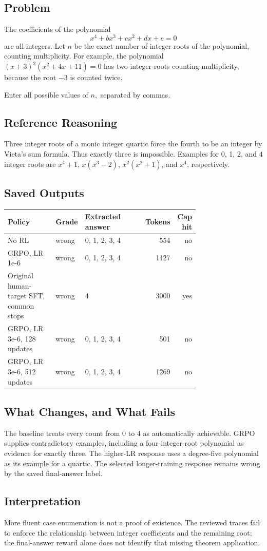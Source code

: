 \documentclass[10pt,letterpaper]{article}
\begin{document}
\subsection*{Problem}
The coefficients of the polynomial
\[x^4 + bx^3 + cx^2 + dx + e = 0\]are all integers.  Let $n$ be the exact number of integer roots of the polynomial, counting multiplicity.  For example, the polynomial $(x + 3)^2 (x^2 + 4x + 11) = 0$ has two integer roots counting multiplicity, because the root $-3$ is counted twice.

Enter all possible values of $n,$ separated by commas.
\subsection*{Reference Reasoning}
Three integer roots of a monic integer quartic force the fourth to be an integer by Vieta's sum formula. Thus exactly three is impossible. Examples for 0, 1, 2, and 4 integer roots are $x^4+1$, $x(x^3-2)$, $x^2(x^2+1)$, and $x^4$, respectively.
\subsection*{Saved Outputs}
\small\begin{longtable}{p{0.29\linewidth}p{0.10\linewidth}p{0.35\linewidth}rr}\toprule Policy & Grade & Extracted answer & Tokens & Cap hit\\\midrule
No RL & wrong & 0, 1, 2, 3, 4 & 554 & no\\
GRPO, LR 1e-6 & wrong & 0, 1, 2, 3, 4 & 1127 & no\\
Original human-target SFT, common stops & wrong & 4 & 3000 & yes\\
GRPO, LR 3e-6, 128 updates & wrong & 0, 1, 2, 3, 4 & 501 & no\\
GRPO, LR 3e-6, 512 updates & wrong & 0, 1, 2, 3, 4 & 1269 & no\\
\bottomrule\end{longtable}\normalsize
\subsection*{What Changes, and What Fails}
The baseline treats every count from 0 to 4 as automatically achievable. GRPO supplies contradictory examples, including a four-integer-root polynomial as evidence for exactly three. The higher-LR response uses a degree-five polynomial as its example for a quartic. The selected longer-training response remains wrong by the saved final-answer label.
\subsection*{Interpretation}
More fluent case enumeration is not a proof of existence. The reviewed traces fail to enforce the relationship between integer coefficients and the remaining root; the final-answer reward alone does not identify that missing theorem application.
\end{document}

